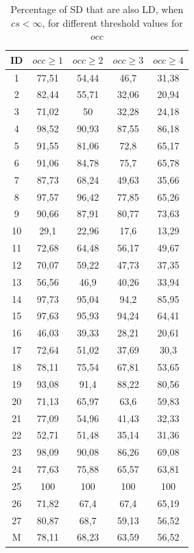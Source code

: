 \documentclass[a4paper,twoside]{article}
\begin{document}
\begin{table}[!h]
\renewcommand{\arraystretch}{1.25}
\caption{Percentage of SD that are also LD,  when  $cs< \infty$, for different threshold values for $occ$ }
\label{table:11}
\centering
\begin{tabular}{|c|c|c|c|c|}
\hline
    ID  & $occ\geq 1$ & $occ\geq 2$ & $occ\geq 3$ & $occ\geq 4$  \\
\hline
1	&	77,51	&	54,44	&	46,7	&	31,38	\\
2	&	82,44	&	55,71	&	32,06	&	20,94	\\
3	&	71,02	&	50	&	32,28	&	24,18	\\
4	&	98,52	&	90,93	&	87,55	&	86,18	\\
5	&	91,55	&	81,06	&	72,8	&	65,17	\\
6	&	91,06	&	84,78	&	75,7	&	65,78	\\
7	&	87,73	&	68,24	&	49,63	&	35,66	\\
8	&	97,57	&	96,42	&	77,85	&	65,26	\\
9	&	90,66	&	87,91	&	80,77	&	73,63	\\
10	&	29,1	&	22,96	&	17,6	&	13,29	\\
11	&	72,68	&	64,48	&	56,17	&	49,67	\\
12	&	70,07	&	59,22	&	47,73	&	37,35	\\
13	&	56,56	&	46,9	&	40,26	&	33,94	\\
14	&	97,73	&	95,04	&	94,2	&	85,95	\\
15	&	97,63	&	95,93	&	94,24	&	64,41	\\
16	&	46,03	&	39,33	&	28,21	&	20,61	\\
17	&	72,64	&	51,02	&	37,69	&	30,3	\\
18	&	78,11	&	75,54	&	67,81	&	53,65	\\
19	&	93,08	&	91,4	&	88,22	&	80,56	\\
20	&	71,13	&	65,97	&	63,6	&	59,83	\\
21	&	77,09	&	54,96	&	41,43	&	32,33	\\
22	&	52,71	&	51,48	&	35,14	&	31,36	\\
23	&	98,09	&	90,08	&	86,26	&	69,08	\\
24	&	77,63	&	75,88	&	65,57	&	63,81	\\
25	&	100	&	100	&	100	&	100	\\
26	&	71,82	&	67,4	&	67,4	&	65,19	\\
27	&	80,87	&	68,7	&	59,13	&	56,52	\\
\hline
M	&	78,11&	68,23	&	63,59	&	56,52	\\
\hline
\end{tabular}
\end{table}
\end{document}
